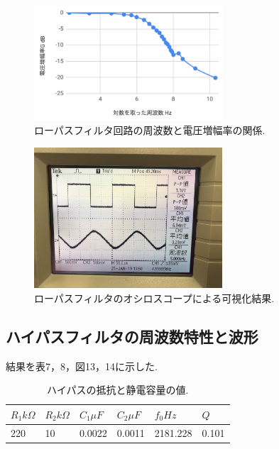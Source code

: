 \documentclass[twocolumn, 10pt,a4j]{jsarticle}
\begin{document}
          \begin{figure}[]
            \begin{center}
                \includegraphics[width=7cm]{../img/low_pass_result.png}
                \caption{ローパスフィルタ回路の周波数と電圧増幅率の関係.}
            \end{center}
          \end{figure}
          
          \begin{figure}[]
            \begin{center}
                \includegraphics[width=7cm]{../img/result_low_pass_vis.jpg}
                \caption{ローパスフィルタのオシロスコープによる可視化結果.}
            \end{center}
          \end{figure}
          

      \subsection{ハイパスフィルタの周波数特性と波形}
          結果を表7，8，図13，14に示した.

          \begin{table}[H]
            \centering
            \footnotesize
            \caption{ハイパスの抵抗と静電容量の値.}
            \label{opeanpu_risouteki_tokusei}
            \begin{tabular}{llllll} \hline
              $R_{1} k \Omega$ & $R_{2} k \Omega$& $C_{1} \mu F$& $C_{2} \mu F$& $f_{0} Hz$ & $Q$ \\ \hline
              220	& 10	& 0.0022	& 0.0011	& 2181.228	& 0.101 \\ \hline
            \end{tabular}
          \end{table}
\end{document}

